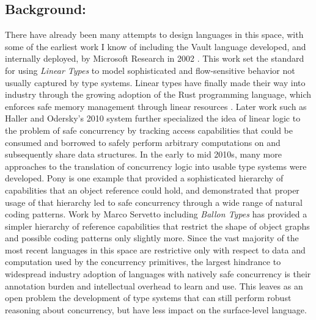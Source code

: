 \documentclass{nsf-grfp}
\begin{document}
\subsection*{Background:} There have already been many attempts to design languages in this space, with some of the earliest work I know of including the Vault language developed, and internally deployed, by Microsoft Research in 2002 \cite{vault}. This work set the standard for using \textit{Linear Types} to model sophisticated and flow-sensitive behavior not usually captured by type systems. Linear types have finally made their way into industry through the growing adoption of the Rust programming language, which enforces safe memory management through linear resources \cite{rust}. Later work such as Haller and Odersky's 2010 system \cite{haller odersky} further specialized the idea of linear logic to the problem of safe concurrency by tracking access capabilities that could be consumed and borrowed to safely perform arbitrary computations on and subsequently share data structures. In the early to mid 2010s, many more approaches to the translation of concurrency logic into usable type systems were developed. Pony \cite{pony} is one example that provided a sophisticated hierarchy of capabilities that an object reference could hold, and demonstrated that proper usage of that hierarchy led to safe concurrency through a wide range of natural coding patterns. Work by Marco Servetto including \textit{Ballon Types} \cite{balloon types} has provided a simpler hierarchy of reference capabilities that restrict the shape of object graphs and possible coding patterns only slightly more. Since the vast majority of the most recent languages in this space are restrictive only with respect to data and computation used by the concurrency primitives, the largest hindrance to widespread industry adoption of languages with natively safe concurrency is their annotation burden and intellectual overhead to learn and use. This leaves as an open problem the development of type systems that can still perform robust reasoning about concurrency, but have less impact on the surface-level language.
\end{document}
